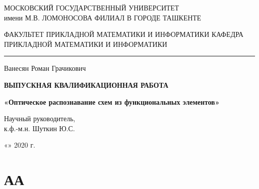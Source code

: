 \documentclass[makeidx, a4paper, 14pt]{extarticle}
\begin{document}
\begin{titlepage}
    \thispagestyle{fancy}
    \renewcommand{\headrulewidth}{0pt}
    \begin{center}
        МОСКОВСКИЙ ГОСУДАРСТВЕННЫЙ УНИВЕРСИТЕТ \\
        имени М.В. ЛОМОНОСОВА
        \medskip
        ФИЛИАЛ В ГОРОДЕ ТАШКЕНТЕ

        \bigskip
        \bigskip

        ФАКУЛЬТЕТ ПРИКЛАДНОЙ МАТЕМАТИКИ И ИНФОРМАТИКИ
        \medskip
        КАФЕДРА ПРИКЛАДНОЙ МАТЕМАТИКИ И ИНФОРМАТИКИ

        \bigskip
        \hrule
        \bigskip

        \large{Ванесян Роман Грачикович}

        \bigskip
        \bigskip

        \textbf{ВЫПУСКНАЯ КВАЛИФИКАЦИОННАЯ РАБОТА}

        \bigskip
        \bigskip

        \textbf{«Оптическое распознавание схем из функциональных элементов»}

        \bigskip
        \bigskip
        \bigskip
        \bigskip
        \bigskip
        \bigskip

        \begin{small}
            \begin{flushleft}
              Научный руководитель, \\
              к.ф.-м.н. \underline{\hspace{10.25cm}} Шуткин Ю.С.
            \end{flushleft}
        
            \smallskip
        
            \begin{flushright}
              «\underline{\hspace{1cm}}» \underline{\hspace{3.5cm}} 2020 г.
            \end{flushright}
        \end{small}

    \end{center}
\end{titlepage}

\tableofcontents
\newpage

\section{АА}
\end{document}
